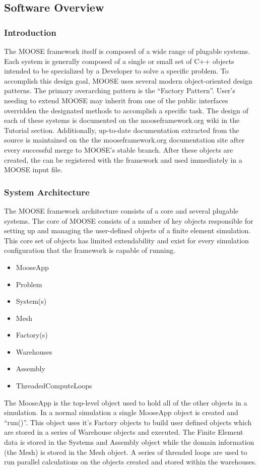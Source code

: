 \documentclass{INLreport}
\begin{document}
\subsection{Software Overview}

\subsubsection{Introduction}
The MOOSE framework itself is composed of a wide range of plugable systems. Each system is generally composed of a single or small set of C++ objects intended to be specialized by a Developer to solve a specific problem. To accomplish this design goal, MOOSE uses several modern object-oriented design patterns. The primary overarching pattern is the ``Factory Pattern''. User's needing to extend MOOSE may inherit from one of the public interfaces overridden the designated methods to accomplish a specific task. The design of each of these systems is documented on the mooseframework.org wiki in the Tutorial section. Additionally, up-to-date documentation extracted from the source is maintained on the the mooseframework.org documentation site after every successful merge to MOOSE's stable branch. After these objects are created, the can be registered with the framework and used immediately in a MOOSE input file.

\subsubsection{System Architecture}
The MOOSE framework architecture consists of a core and several plugable systems. The core of MOOSE consists of a number of key objects responsible for setting up and managing the user-defined objects of a finite element simulation. This core set of objects has limited extendability and exist for every simulation configuration that the framework is capable of running.

\begin{itemize}
\item MooseApp
\item Problem
\item System(s)
\item Mesh
\item Factory(s)
\item Warehouses
\item Assembly
\item ThreadedComputeLoops
\end{itemize}

The MooseApp is the top-level object used to hold all of the other objects in a simulation. In a normal simulation a single MooseApp object is created and ``run()''. This object uses it's Factory objects to build user defined objects which are stored in a series of Warehouse objects and executed. The Finite Element data is stored in the Systems and Assembly object while the domain information (the Mesh) is stored in the Mesh object. A series of threaded loops are used to run parallel calculations on the objects created and stored within the warehouses.
\end{document}
